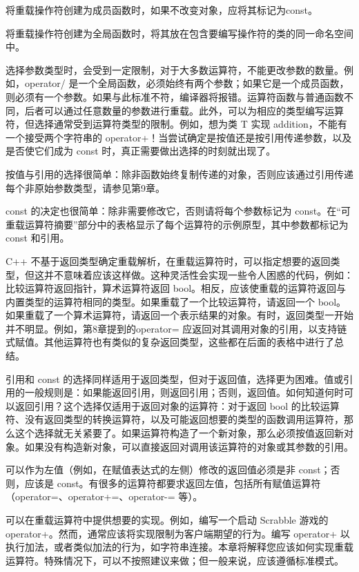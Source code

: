 将重载操作符创建为成员函数时，如果不改变对象，应将其标记为const。

将重载操作符创建为全局函数时，将其放在包含要编写操作符的类的同一命名空间中。


选择参数类型时，会受到一定限制，对于大多数运算符，不能更改参数的数量。例如，operator/ 是一个全局函数，必须始终有两个参数；如果它是一个成员函数，则必须有一个参数。如果与此标准不符，编译器将报错。运算符函数与普通函数不同，后者可以通过任意数量的参数进行重载。此外，可以为相应的类型编写运算符，但选择通常受到运算符类型的限制。例如，想为类 T 实现 addition，不能有一个接受两个字符串的 operator+！当尝试确定是按值还是按引用传递参数，以及是否使它们成为 const 时，真正需要做出选择的时刻就出现了。

按值与引用的选择很简单：除非函数始终复制传递的对象，否则应该通过引用传递每个非原始参数类型，请参见第9章。

const 的决定也很简单：除非需要修改它，否则请将每个参数标记为 const。在“可重载运算符摘要”部分中的表格显示了每个运算符的示例原型，其中参数都标记为 const 和引用。


C++ 不基于返回类型确定重载解析，在重载运算符时，可以指定想要的返回类型，但这并不意味着应该这样做。这种灵活性会实现一些令人困惑的代码，例如：比较运算符返回指针，算术运算符返回 bool。相反，应该使重载的运算符返回与内置类型的运算符相同的类型。如果重载了一个比较运算符，请返回一个 bool。如果重载了一个算术运算符，请返回一个表示结果的对象。有时，返回类型一开始并不明显。例如，第8章提到的operator= 应返回对其调用对象的引用，以支持链式赋值。其他运算符也有类似的复杂返回类型，这些都在后面的表格中进行了总结。

引用和 const 的选择同样适用于返回类型，但对于返回值，选择更为困难。值或引用的一般规则是：如果能返回引用，则返回引用；否则，返回值。如何知道何时可以返回引用？这个选择仅适用于返回对象的运算符：对于返回 bool 的比较运算符、没有返回类型的转换运算符，以及可能返回想要的类型的函数调用运算符，那么这个选择就无关紧要了。如果运算符构造了一个新对象，那么必须按值返回新对象。如果没有构造新对象，可以直接返回对调用该运算符的对象或其参数的引用。

可以作为左值（例如，在赋值表达式的左侧）修改的返回值必须是非 const；否则，应该是 const。有很多的运算符都要求返回左值，包括所有赋值运算符（operator=、operator+=、operator-= 等）。


可以在重载运算符中提供想要的实现。例如，编写一个启动 Scrabble 游戏的 operator+。然而，通常应该将实现限制为客户端期望的行为。编写 operator+ 以执行加法，或者类似加法的行为，如字符串连接。本章将解释您应该如何实现重载运算符。特殊情况下，可以不按照建议来做；但一般来说，应该遵循标准模式。

